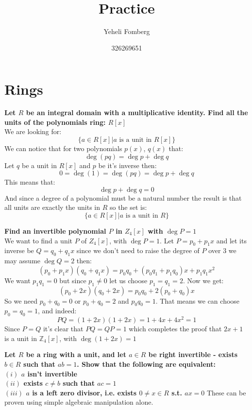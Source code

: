 \documentclass{article}
\title{\textbf{Practice}}
\author{Yeheli Fomberg}
\date{326269651}
\theoremstyle{plain}
\newcommand{\Z}{\mathbb{Z}}
\begin{document}
	\maketitle
	\newpage
	\section{Rings}
	\textbf{Let $R$ be an integral domain with a multiplicative identity. 
	Find all the units of the polynomials ring: $R[x]$} \\
	We are looking for:
	\[
		\{a \in R[x] \vert \text{$a$ is a unit in $R[x]$}\}
	\]
	We can notice that for two polynomials $p(x)$, $q(x)$ that:
	\[
		\deg(pq) = \deg p + \deg q
	\]
	Let $q$ be a unit in $R[x]$ and $p$ be it's inverse then:
	\[
		0 = \deg(1) = \deg(pq) = \deg p + \deg q
	\]
	This means that:
	\[
		\deg p + \deg q = 0
	\]
	And since a degree of a polynomial must be a natural number the result
	is that all units are exactly the units in $R$ so the set is:
	\[
		\{a \in R[x] \vert \text{$a$ is a unit in $R$}\}
	\]
	
	\newpage
	
	\textbf{Find an invertible polynomial $P$ in $Z_4[x]$ with $\deg P=1$} \\
	We want to find a unit $P$ of $Z_4[x]$, with $\deg P = 1$. Let 
	$P = p_0 + p_1x$
	and let its inverse be 
	$Q = q_0+q_1x$ 
	since we don't need to raise the degree of $P$ over $3$ we may assume 
	$\deg Q = 2$ then:
	\[
		(p_0+p_1x)(q_0+q_1x) = p_0q_0 + (p_0q_1+p_1q_0)x + p_1q_1x^2
	\]
	We want $p_1q_1 = 0$ but since $p_1 \neq 0$ let us choose $p_1=q_1=2$.
	Now we get:
	\[
		(p_0+2x)(q_0+2x) = p_0q_0 + 2(p_0+q_0)x
	\]
	So we need $p_0+q_0=0$ or $p_0+q_0=2$ and $p_0q_0 = 1$. That means we can
	choose $p_0=q_0=1$, and indeed:
	\[
		PQ = (1+2x)(1+2x) = 1 + 4x + 4x^2 = 1
	\]
	Since $P=Q$ it's clear that $PQ=QP=1$ which completes the proof that 
	$2x+1$ is a unit in $\Z_4[x]$, with $\deg (1+2x) = 1$
	
	\newpage
	
	\textbf{Let $R$ be a ring with a unit, and let $a\in R$ be right 
	invertible - exists $b\in R$ such that $ab=1$. Show that the following are	
	equivalent: \\
	$(i)$ $a$ isn't invertible \\
	$(ii)$ exists $c\neq b$ such that $ac = 1$ \\
	$(iii)$ $a$ is a left zero divisor, i.e. exists $0\neq x\in R$ s.t. 
	$ax=0$}
	These can be proven using simple algebraic manipulation alone.
	
\end{document}
